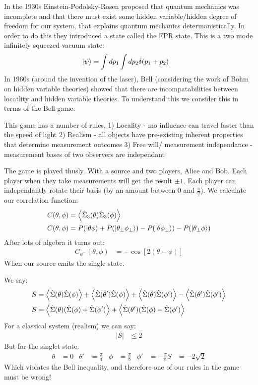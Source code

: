 In the 1930s Einstein-Podolsky-Rosen proposed that quantum mechanics was incomplete and that there must exist some hidden variable/hidden degree of freedom for our system, that explains quantum mechanics determanistically.
In order to do this they introduced a state called the EPR state. This is a two mode infinitely squeezed vacuum state:
\begin{align*}
	\ket{\psi} &= \int dp_1\int dp_2 \delta(p_1 + p_2)
\end{align*}
In 1960s (around the invention of the laser), Bell (considering the work of Bohm on hidden variable theories) showed that there are incompatabilities between locatlity and hidden variable theories. To understand this we consider this in terms of the Bell game:

This game has a number of rules, 1) Locality - mo influence can travel faster than the speed of light 
2) Realism - all objects have pre-existing inherent properties that determine measurement outcomes 
3) Free will/ measurement independance - measurement bases of two observers are independant

The game is played thusly. With a source and two players, Alice and Bob. Each player when they take measurements will get the result $\pm 1$. Each player can independantly rotate their basis (by an amount between $0$ and $\frac{\pi}{2}$).
We calculate our correlation function:
\begin{align*}
	C(\theta,\phi) &= \expval{\hat{\Sigma}_3(\theta)\hat{\Sigma}_3(\phi)} \\
	C(\theta,\phi) &= P(\ket{\theta\phi} + P(\ket{\theta_\perp\phi_\perp}) - P(\ket{\theta\phi_\perp}) - P(\ket{\theta_\perp\phi})
\end{align*}
After lots of algebra it turns out:
\begin{align*}
	C_{\psi^-}(\theta,\phi) &= -\cos[2(\theta-\phi)]
\end{align*}
When our source emits the single state.

We say:
\begin{align*}
	S &= \expval{\hat{\Sigma}(\theta)\hat{\Sigma}(\phi)} + \expval{\hat{\Sigma}(\theta')\hat{\Sigma}(\phi)} + \expval{\hat{\Sigma}(\theta)\hat{\Sigma}(\phi')} - \expval{\hat{\Sigma}(\theta')\hat{\Sigma}(\phi')} \\
	S &= \expval{\hat{\Sigma}(\theta)(\hat{\Sigma}(\phi) + \hat{\Sigma}(\phi')} + \expval{\hat{\Sigma}(\theta')(\hat{\Sigma}(\phi) - \hat{\Sigma}(\phi')}
\end{align*}
For a classical system (realism) we can say:
\begin{align*}
	|S| &\leq 2
\end{align*}
But for the singlet state:
\begin{align*}
	\theta &= 0 & \theta' &= \frac{\pi}{4} & \phi &= \frac{\pi}{8} & \phi' &= -\frac{\pi}{8}
	S &= -2\sqrt{2}
\end{align*}
Which violates the Bell inequality, and therefore one of our rules in the game must be wrong!
